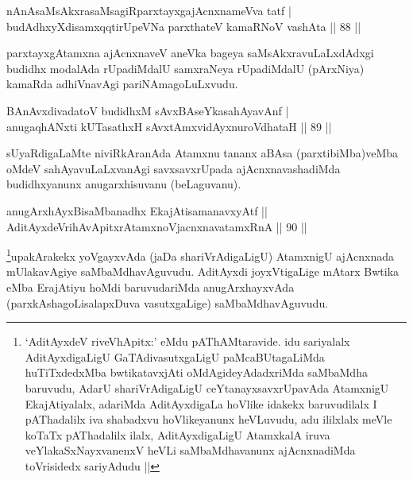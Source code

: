 
\begin{shl}
nAnAsaMsAkxrasaMsagiRparxtayxgajAcnxnameVva tatf | \\
budAdhxyXdisamxqqtirUpeVNa parxthateV kamaRNoV vashAta \hfill||  88 || 
\end{shl}

\begin{artha}
parxtayxgAtamxna ajAcnxnaveV aneVka bageya saMsAkxravuLaLxdAdxgi budidhx modalAda rUpadiMdalU samxraNeya rUpadiMdalU (pArxNiya) kamaRda adhiVnavAgi pariNAmagoLuLxvudu.
\end{artha}

\begin{shl}
BAnAvxdivadatoV budidhxM sAvxBAseYkasahAyavAnf | \\
anugaqhANxti kUTasathxH sAvxtAmxvidAyxnuroVdhataH \hfill||  89 ||  
\end{shl}

\begin{artha}
sUyaRdigaLaMte niviRkAranAda Atamxnu tananx aBAsa (parxtibiMba)veMba oMdeV sahAyavuLaLxvanAgi savxsavxrUpada ajAcnxnavashadiMda budidhxyanunx anugarxhisuvanu (beLaguvanu).
\end{artha}


\begin{shl}
anugArxhAyxBisaMbanadhx EkajAtisamanavxyAtf ||  \\
AditAyxdeVrihAvApitxrAtamxnoV\s jacnxnavatamxRnA \hfill||  90 ||  
\end{shl}

\begin{artha}
\footnote{`AditAyxdeV riveVhApitx:' eMdu pAThAMtaravide. idu sariyalalx AditAyxdigaLigU GaTAdivasutxgaLigU paMcaBUtagaLiMda huTiTxdedxMba bwtikatavxjAti oMdAgideyAdadxriMda saMbaMdha baruvudu, AdarU shariVrAdigaLigU ceYtanayxsavxrUpavAda AtamxnigU EkajAtiyalalx, adariMda AditAyxdigaLa hoVlike idakekx baruvudilalx I pAThadalilx iva shabadxvu hoVlikeyanunx heVLuvudu, adu ililxlalx meVle koTaTx pAThadalilx ilalx, AditAyxdigaLigU AtamxkalA iruva veYlakaSxNayxvanenxV heVLi saMbaMdhavanunx ajAcnxnadiMda toVrisidedx sariyAdudu ||}upakArakekx yoVgayxvAda (jaDa shariVrAdigaLigU) AtamxnigU ajAcnxnada mUlakavAgiye saMbaMdhavAguvudu. AditAyxdi joyxVtigaLige mAtarx Bwtika eMba ErajAtiyu hoMdi baruvudariMda anugArxhayxvAda (parxkAshagoLisalapxDuva vasutxgaLige) saMbaMdhavAguvudu.
\end{artha}

